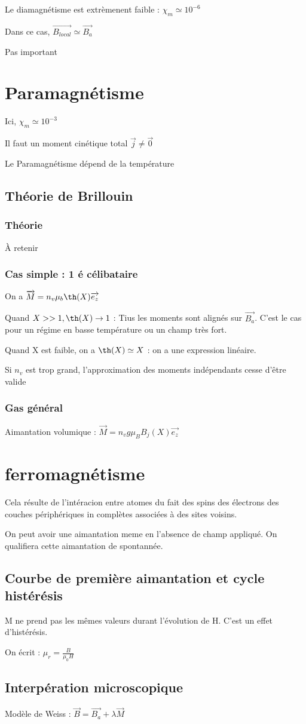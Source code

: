 \documentclass[french]{yLectureNote}
\renewcommand{\vec}{\overrightarrow}
\begin{document}
Le diamagnétisme est extrèmenent faible : $\chi_m \simeq 10^{-6}$

Dans ce cas, $\vec{B_{local}}\simeq \vec{B_a}$

Pas important
\section{Paramagnétisme}
Ici, $\chi_m \simeq 10^{-3}$


Il faut un moment cinétique total $\vec{j}\neq \vec{0}$

Le Paramagnétisme dépend de la température
\subsection{Théorie de Brillouin}
\subsubsection{Théorie}
À retenir
\subsubsection{Cas simple : 1 é célibataire}
On a $\vec{M} = n_v \mu_b \th(X)\vec{e_z}$

Quand $X>> 1, \th(X)\to 1$ : Tius les moments sont alignés sur $\vec{B_a}$. C'est le cas pour un régime en basse température ou un champ très fort.

Quand X est faible, on a $\th(X) \simeq X$ : on a une expression linéaire.

Si $n_v$ est trop grand, l'approximation des moments indépendants cesse d'être valide
\subsubsection{Gas général}
\begin{definition}
    Aimantation volumique : $\vec{M} = n_v g\mu_B B_j(X)\vec{e_z}$

\end{definition}
\section{ferromagnétisme}
Cela résulte de l'intéracion entre atomes du fait des spins des électrons des couches périphériques in complètes associées à des
sites voisins.

On peut avoir une aimantation meme en l'absence de champ appliqué. On qualifiera cette aimantation de spontannée.

\subsection{Courbe de première aimantation et cycle histérésis}
M ne prend pas les mêmes valeurs durant l'évolution de H. C'est un effet d'histérésis.

On écrit : $\mu_r = \frac{B}{\mu_0H}$
\subsection{Interpération microscopique}
\begin{definition}
    Modèle de Weiss : $\vec{B} = \vec{B_a}+\lambda \vec{M}$
\end{definition}
\end{document}

